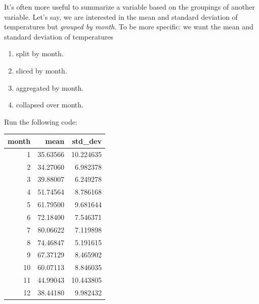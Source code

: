 \documentclass[12pt,]{krantz}
\makeatletter
\newenvironment{Shaded}{\begin{snugshade}}{\end{snugshade}}
\newcommand{\KeywordTok}[1]{\textcolor[rgb]{0.27,0.27,0.27}{\textbf{#1}}}
\newcommand{\DataTypeTok}[1]{\textcolor[rgb]{0.27,0.27,0.27}{#1}}
\newcommand{\StringTok}[1]{\textcolor[rgb]{0.5,0.5,0.5}{#1}}
\newcommand{\OtherTok}[1]{\textcolor[rgb]{0.37,0.37,0.37}{#1}}
\newcommand{\OperatorTok}[1]{\textcolor[rgb]{0.43,0.43,0.43}{\textbf{#1}}}
\newcommand{\NormalTok}[1]{#1}
\providecommand{\tightlist}{%
  \setlength{\itemsep}{0pt}\setlength{\parskip}{0pt}}
\newenvironment{kframe}{%
\medskip{}
\setlength{\fboxsep}{.8em}
 \def\at@end@of@kframe{}%
 \ifinner\ifhmode%
  \def\at@end@of@kframe{\end{minipage}}%
  \begin{minipage}{\columnwidth}%
 \fi\fi%
 \def\FrameCommand##1{\hskip\@totalleftmargin \hskip-\fboxsep
 \colorbox{shadecolor}{##1}\hskip-\fboxsep
     \hskip-\linewidth \hskip-\@totalleftmargin \hskip\columnwidth}%
 \MakeFramed {\advance\hsize-\width
   \@totalleftmargin\z@ \linewidth\hsize
   \@setminipage}}%
 {\par\unskip\endMakeFramed%
 \at@end@of@kframe}
\renewenvironment{Shaded}{\begin{kframe}}{\end{kframe}}
\theoremstyle{definition}
\theoremstyle{definition}
\theoremstyle{definition}
\theoremstyle{remark}
\makeatother
\begin{document}
It's often more useful to summarize a variable based on the groupings of
another variable. Let's say, we are interested in the mean and standard
deviation of temperatures but \emph{grouped by month}. To be more
specific: we want the mean and standard deviation of temperatures

\begin{enumerate}
\def\labelenumi{\arabic{enumi}.}
\tightlist
\item
  split by month.
\item
  sliced by month.
\item
  aggregated by month.
\item
  collapsed over month.
\end{enumerate}

Run the following code:

\begin{Shaded}
\end{Shaded}

\begin{table}[H]
\centering\begingroup\fontsize{10}{12}\selectfont

\begin{tabular}{r|r|r}
\hline
month & mean & std\_dev\\
\hline
1 & 35.63566 & 10.224635\\
\hline
2 & 34.27060 & 6.982378\\
\hline
3 & 39.88007 & 6.249278\\
\hline
4 & 51.74564 & 8.786168\\
\hline
5 & 61.79500 & 9.681644\\
\hline
6 & 72.18400 & 7.546371\\
\hline
7 & 80.06622 & 7.119898\\
\hline
8 & 74.46847 & 5.191615\\
\hline
9 & 67.37129 & 8.465902\\
\hline
10 & 60.07113 & 8.846035\\
\hline
11 & 44.99043 & 10.443805\\
\hline
12 & 38.44180 & 9.982432\\
\hline
\end{tabular}
\endgroup{}
\end{table}
\end{document}
